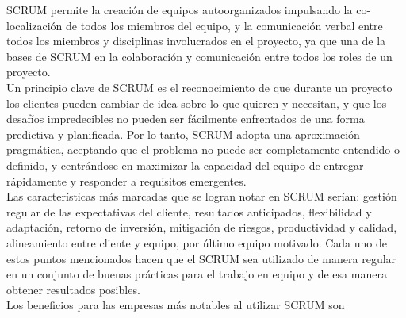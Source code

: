 \documentclass[../pfc.tex]{subfiles}
\begin{document}
	SCRUM permite la creación de equipos autoorganizados impulsando la co-localización de todos los miembros del equipo, y la comunicación verbal entre todos los miembros y disciplinas involucrados en el proyecto, ya que una de la bases de SCRUM en la colaboración y comunicación entre todos los roles de un proyecto. \\
	
	Un principio clave de SCRUM es el reconocimiento de que durante un proyecto los clientes pueden cambiar de idea sobre lo que quieren y necesitan, y que los desafíos impredecibles no pueden ser fácilmente enfrentados de una forma predictiva y planificada. Por lo tanto, SCRUM adopta una aproximación pragmática, aceptando que el problema no puede ser completamente entendido o definido, y centrándose en maximizar la capacidad del equipo de entregar rápidamente y responder a requisitos emergentes.\\
	
	Las características más marcadas que se logran notar en SCRUM serían: gestión regular de las expectativas del cliente, resultados anticipados, flexibilidad y adaptación, retorno de inversión, mitigación de riesgos, productividad y calidad, alineamiento entre cliente y equipo, por último equipo motivado. Cada uno de estos puntos mencionados hacen que el SCRUM sea utilizado de manera regular en un conjunto de buenas prácticas para el trabajo en equipo y de esa manera obtener resultados posibles.\\
	
	Los beneficios para las empresas más notables al utilizar SCRUM son
	
\end{document}

